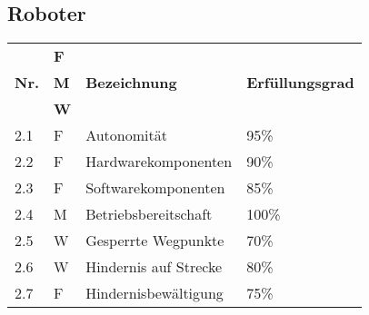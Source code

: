 \documentclass[main.tex]{subfiles} %
\begin{document}
\subsection*{Roboter}

\begin{tabular}{|l|p{0.5cm}|p{4cm}|p{10cm}|}
  \hline
               & \textbf{F} &                                  &                                                                                                                                                                                                                                                                                                                                                                                 \\
  \textbf{Nr.} & \textbf{M} & \textbf{Bezeichnung}             & \textbf{Erfüllungsgrad}                                                                                                                                                                                                                                                                                                                                                                                \\
               & \textbf{W} &                                  &                                                                                                                                                                                                                                                                                                                                                                         \\
  \hline
  2.1          & F              & Autonomität                  & 95\%                    \\
  2.2          & F              & Hardwarekomponenten          & 90\%                    \\
  2.3          & F              & Softwarekomponenten          & 85\%                    \\
  2.4          & M              & Betriebsbereitschaft         & 100\%                   \\
  2.5          & W              & Gesperrte Wegpunkte          & 70\%                    \\
  2.6          & W              & Hindernis auf Strecke        & 80\%                    \\
  2.7          & F              & Hindernisbewältigung         & 75\%                    \\

\end{tabular}
\end{document}
